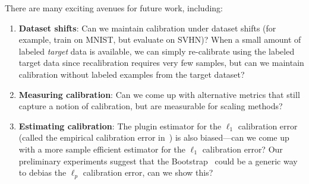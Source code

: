 There are many exciting avenues for future work, including:
\begin{enumerate}
\item \textbf{Dataset shifts}: Can we maintain calibration under dataset shifts (for example, train on MNIST, but evaluate on SVHN)? When a small amount of labeled \emph{target} data is available, we can simply re-calibrate using the labeled target data since recalibration requires very few samples, but can we maintain calibration without labeled examples from the target dataset?
\item \textbf{Measuring calibration}: Can we come up with alternative metrics that still capture a notion of calibration, but are measurable for scaling methods?
\item \textbf{Estimating calibration}: The plugin estimator for the $\ell_1$ calibration error (called the empirical calibration error in~\cite{guo2017calibration, nixon2019calibration}) is also biased---can we come up with a more sample efficient estimator for the $\ell_1$ calibration error? Our preliminary experiments suggest that the Bootstrap~\cite{efron1979bootstrap} could be a generic way to debias the $\ell_p$ calibration error, can we show this?
\end{enumerate}
